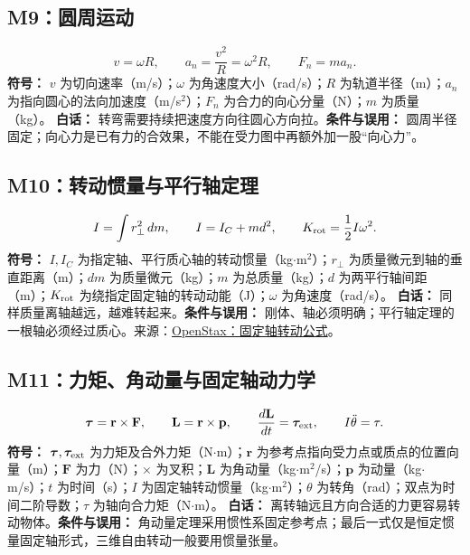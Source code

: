 \documentclass[UTF8,zihao=-4,openany,oneside,fontset=windows]{ctexbook}
\begin{document}
\subsection{M9：圆周运动}
\begin{equation}
v=\omega R,\qquad a_n=\frac{v^2}{R}=\omega^2R,\qquad F_n=ma_n.
\end{equation}
\textbf{符号：} $v$ 为切向速率（m/s）；$\omega$ 为角速度大小（rad/s）；$R$ 为轨道半径（m）；$a_n$ 为指向圆心的法向加速度（m/s$^2$）；$F_n$ 为合力的向心分量（N）；$m$ 为质量（kg）。
\textbf{白话：} 转弯需要持续把速度方向往圆心方向拉。\textbf{条件与误用：} 圆周半径固定；向心力是已有力的合效果，不能在受力图中再额外加一股“向心力”。

\subsection{M10：转动惯量与平行轴定理}
\begin{equation}
I=\int r_\perp^2\,dm,\qquad I=I_C+md^2,\qquad K_{\rm rot}=\frac12I\omega^2.
\end{equation}
\textbf{符号：} $I,I_C$ 为指定轴、平行质心轴的转动惯量（kg$\cdot$m$^2$）；$r_\perp$ 为质量微元到轴的垂直距离（m）；$dm$ 为质量微元（kg）；$m$ 为总质量（kg）；$d$ 为两平行轴间距（m）；$K_{\rm rot}$ 为绕指定固定轴的转动动能（J）；$\omega$ 为角速度（rad/s）。
\textbf{白话：} 同样质量离轴越远，越难转起来。\textbf{条件与误用：} 刚体、轴必须明确；平行轴定理的一根轴必须经过质心。来源：\href{https://openstax.org/books/university-physics-volume-1/pages/10-key-equations}{OpenStax：固定轴转动公式}。

\subsection{M11：力矩、角动量与固定轴动力学}
\begin{equation}
\boldsymbol\tau=\mathbf r\times\mathbf F,\qquad \mathbf L=\mathbf r\times\mathbf p,\qquad \frac{d\mathbf L}{dt}=\boldsymbol\tau_{\rm ext},\qquad I\ddot\theta=\tau.
\end{equation}
\textbf{符号：} $\boldsymbol\tau,\boldsymbol\tau_{\rm ext}$ 为力矩及合外力矩（N$\cdot$m）；$\mathbf r$ 为参考点指向受力点或质点的位置向量（m）；$\mathbf F$ 为力（N）；$\times$ 为叉积；$\mathbf L$ 为角动量（kg$\cdot$m$^2$/s）；$\mathbf p$ 为动量（kg$\cdot$m/s）；$t$ 为时间（s）；$I$ 为固定轴转动惯量（kg$\cdot$m$^2$）；$\theta$ 为转角（rad）；双点为时间二阶导数；$\tau$ 为轴向合力矩（N$\cdot$m）。
\textbf{白话：} 离转轴远且方向合适的力更容易转动物体。\textbf{条件与误用：} 角动量定理采用惯性系固定参考点；最后一式仅是恒定惯量固定轴形式，三维自由转动一般要用惯量张量。
\end{document}
